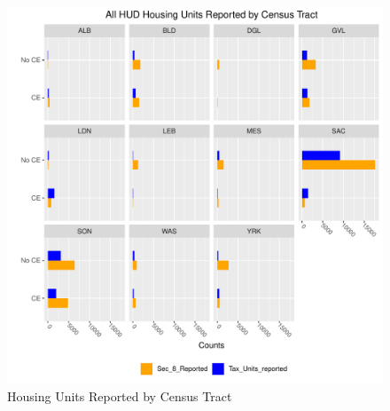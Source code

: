 \documentclass{article}\usepackage[]{graphicx}\usepackage[]{color}
\makeatletter
\def\maxwidth{ %
  \ifdim\Gin@nat@width>\linewidth
    \linewidth
  \else
    \Gin@nat@width
  \fi
}
\newenvironment{knitrout}{}{} %
\makeatother
\begin{document}
\begin{knitrout}
\color{fgcolor}\begin{figure}
\includegraphics[width=\maxwidth]{figure/MultiPlot_All_Units_Counts_dodge-1} \caption[Housing Units Reported by Census Tract]{Housing Units Reported by Census Tract}\label{fig:MultiPlot_All_Units_Counts_dodge}
\end{figure}


\end{knitrout}
\end{document}
